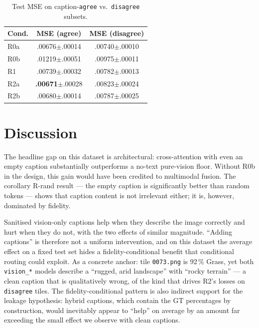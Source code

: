 \documentclass[conference]{IEEEtran}
\begin{document}
\begin{table}[ht]
\centering
\footnotesize
\caption{Test MSE on caption-\texttt{agree} vs.\ \texttt{disagree} subsets.}
\label{tab:fidelity}
\begin{tabular}{@{}lcc@{}}
\toprule
\textbf{Cond.} & \textbf{MSE (agree)} & \textbf{MSE (disagree)} \\
\midrule
R0a    & .00676$\pm$.00014 & .00740$\pm$.00010 \\
R0b    & .01219$\pm$.00051 & .00975$\pm$.00011 \\
R1     & .00739$\pm$.00032 & .00782$\pm$.00013 \\
R2a    & \textbf{.00671}$\pm$.00028 & .00823$\pm$.00024 \\
R2b    & .00680$\pm$.00014 & .00787$\pm$.00025 \\
\bottomrule
\end{tabular}
\end{table}

\section{Discussion}

The headline gap on this dataset is architectural: cross-attention with
even an empty caption substantially outperforms a no-text pure-vision
floor. Without R0b in the design, this gain would have been credited to
multimodal fusion. The corollary R-rand result --- the empty caption is
significantly better than random tokens --- shows that caption content is
not irrelevant either; it is, however, dominated by fidelity.

Sanitised vision-only captions help when they describe the image
correctly and hurt when they do not, with the two effects of similar
magnitude. ``Adding captions'' is therefore not a uniform intervention,
and on this dataset the average effect on a fixed test set hides a
fidelity-conditional benefit that conditional routing could exploit. As
a concrete anchor: tile \texttt{0073.png} is 92\,\% Grass, yet both
\texttt{vision\_*} models describe a ``rugged, arid landscape'' with
``rocky terrain'' --- a clean caption that is qualitatively wrong, of
the kind that drives R2's losses on \texttt{disagree} tiles. The
fidelity-conditional pattern is also indirect support for the leakage
hypothesis: hybrid captions, which contain the GT percentages by
construction, would inevitably appear to ``help'' on average by an
amount far exceeding the small effect we observe with clean captions.
\end{document}
